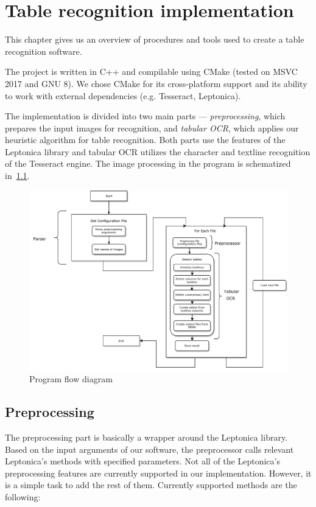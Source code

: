 \chapter{Table recognition implementation}

This chapter gives us an overview of procedures and tools used to create a table recognition software. 

The project is written in C++ and compilable using CMake (tested on MSVC 2017 and GNU 8). We chose CMake for its cross-platform support and its ability to work with external dependencies (e.g. Tesseract, Leptonica). 

The implementation is divided into two main parts --- \emph{preprocessing}, which prepares the input images for recognition, and \emph{tabular OCR}, which applies our heuristic algorithm for table recognition. Both parts use the features of the Leptonica library and tabular OCR utilizes the character and textline recognition of the Tesseract engine. The image processing in the program is schematized in~\cref{fig:programFlow}.

\begin{figure}
    \centering
	\includegraphics[width=1.0\linewidth]{img/implementation/programFlow.pdf}
	\caption{Program flow diagram}
	\label{fig:programFlow}
\end{figure}

\section{Preprocessing}

The preprocessing part is basically a wrapper around the Leptonica library. Based on the input arguments of our software, the preprocessor calls relevant Leptonica's methods with specified parameters. Not all of the Leptonica's preprocessing features are currently supported in our implementation. However, it is a simple task to add the rest of them. Currently supported methods are the following:

